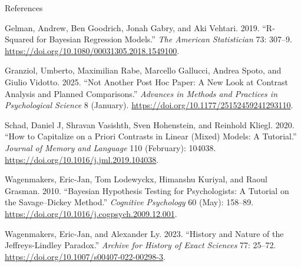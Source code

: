 \documentclass[
  ignorenonframetext,
]{beamer}
\newlength{\cslhangindent}
\newenvironment{CSLReferences}[2] %
 {\begin{list}{}{%
  \setlength{\itemindent}{0pt}
  \setlength{\leftmargin}{0pt}
  \setlength{\parsep}{0pt}
  \ifodd #1
   \setlength{\leftmargin}{\cslhangindent}
   \setlength{\itemindent}{-1\cslhangindent}
  \fi
  \setlength{\itemsep}{#2\baselineskip}}}
 {\end{list}}
\begin{document}
\begin{frame}{References}
\label{references}
\label{refs}
\begin{CSLReferences}{1}{0}
Gelman, Andrew, Ben Goodrich, Jonah Gabry, and Aki Vehtari. 2019.
{``R-Squared for Bayesian Regression Models.''} \emph{The American
Statistician} 73: 307--9.
\url{https://doi.org/10.1080/00031305.2018.1549100}.

Granziol, Umberto, Maximilian Rabe, Marcello Gallucci, Andrea Spoto, and
Giulio Vidotto. 2025. {``Not Another Post Hoc Paper: A New Look at
Contrast Analysis and Planned Comparisons.''} \emph{Advances in Methods
and Practices in Psychological Science} 8 (January).
\url{https://doi.org/10.1177/25152459241293110}.

Schad, Daniel J, Shravan Vasishth, Sven Hohenstein, and Reinhold Kliegl.
2020. {``How to Capitalize on a Priori Contrasts in Linear (Mixed)
Models: A Tutorial.''} \emph{Journal of Memory and Language} 110
(February): 104038. \url{https://doi.org/10.1016/j.jml.2019.104038}.

Wagenmakers, Eric-Jan, Tom Lodewyckx, Himanshu Kuriyal, and Raoul
Grasman. 2010. {``Bayesian Hypothesis Testing for Psychologists: A
Tutorial on the Savage--Dickey Method.''} \emph{Cognitive Psychology} 60
(May): 158--89. \url{https://doi.org/10.1016/j.cogpsych.2009.12.001}.

Wagenmakers, Eric-Jan, and Alexander Ly. 2023. {``History and Nature of
the Jeffreys-Lindley Paradox.''} \emph{Archive for History of Exact
Sciences} 77: 25--72. \url{https://doi.org/10.1007/s00407-022-00298-3}.

\end{CSLReferences}
\end{frame}
\end{document}
